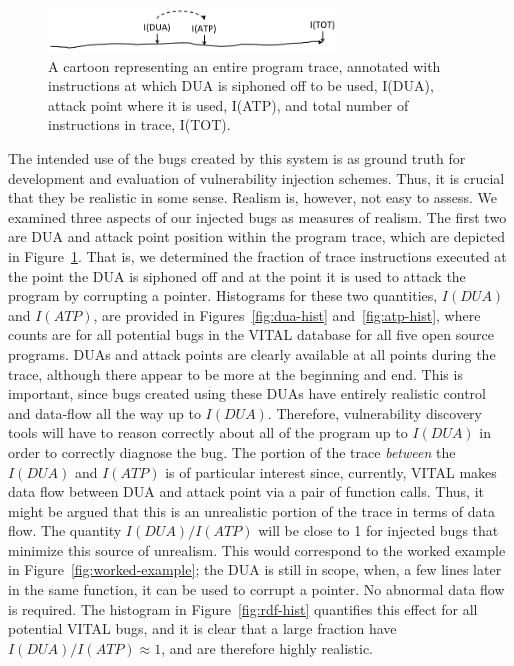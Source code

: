 \begin{figure}
\centering
\includegraphics[width=3in]{trace-dua-atp.png}
\caption{A cartoon representing an entire program trace, annotated with instructions at which DUA is siphoned off to be used, I(DUA), attack point where it is used, I(ATP), and total number of instructions in trace, I(TOT).}
\label{fig:dua-atp-trace}
\end{figure}

The intended use of the bugs created by this system is as ground truth for development and evaluation of vulnerability injection schemes.
Thus, it is crucial that they be realistic in some sense.  
Realism is, however, not easy to assess.
We examined three aspects of our injected bugs as measures of realism. 
The first two are DUA and attack point position within the program trace, which are depicted in Figure~\ref{fig:dua-atp-trace}.
That is, we determined the fraction of trace instructions executed at the point the DUA is siphoned off and at the point it is used to attack the program by corrupting a pointer.
Histograms for these two quantities, $I(DUA)$ and $I(ATP)$, are provided in Figures~\ref{fig:dua-hist} and~\ref{fig:atp-hist}, where counts are for all potential bugs in the VITAL database for all five open source programs. 
DUAs and attack points are clearly available at all points during the trace, although there appear to be more at the beginning and end.
This is important, since bugs created using these DUAs have entirely realistic control and data-flow all the way up to $I(DUA)$.
Therefore, vulnerability discovery tools will have to reason correctly about all of the program up to $I(DUA)$ in order to correctly diagnose the bug.
The portion of the trace \emph{between} the $I(DUA)$ and $I(ATP)$ is of particular interest since, currently, VITAL makes data flow between DUA and attack point via a pair of function calls.
Thus, it might be argued that this is an unrealistic portion of the trace in terms of data flow.
The quantity $I(DUA)/I(ATP)$ will be close to 1 for injected bugs that minimize this source of unrealism.
This would correspond to the worked example in Figure~\ref{fig:worked-example}; the DUA is still in scope, when, a few lines later in the same function, it can be used to corrupt a pointer.
No abnormal data flow is required.
The histogram in Figure~\ref{fig:rdf-hist} quantifies this effect for all potential VITAL bugs, and it is clear that a large fraction have $I(DUA)/I(ATP) \approx 1$, and are therefore highly realistic.

